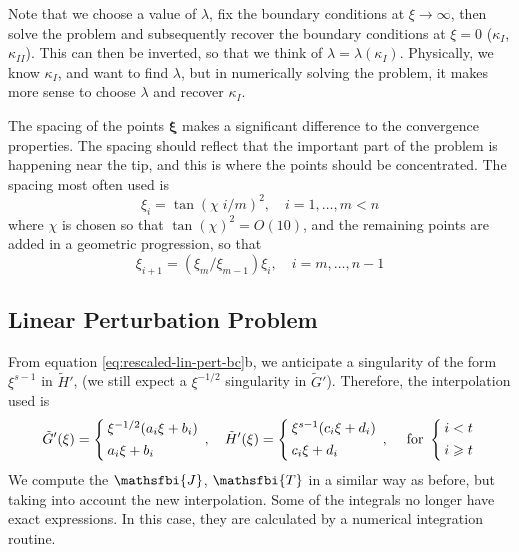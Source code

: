 \documentclass{jfm}
\begin{document}
Note that we choose a value of $\lambda$, fix the boundary conditions
at $\xi \to \infty$, then solve the problem and subsequently recover
the boundary conditions at $\xi=0$ ($\kappa_I$, $\kappa_{II}$).
This can then be inverted, so that we think of $\lambda = \lambda(\kappa_I)$.
Physically, we know $\kappa_I$, and want to find $\lambda$, but in numerically
solving the problem, it makes more sense to choose $\lambda$ and recover 
$\kappa_I$.

The spacing of the points $\boldsymbol{\xi}$ makes a significant difference to 
the convergence properties. The spacing should reflect that the important 
part of the problem is happening near the tip, and this is where the points
should be concentrated. The spacing most often used is 
\begin{equation}
\xi_i = \tan( \chi \; i/m )^2, \quad i=1,\dots,m < n
\end{equation}
where $\chi$ is chosen so that $\tan(\chi)^2 = O(10)$, and the remaining points
are added in a geometric progression, so that 
\begin{equation}
\xi_{i+1} = (\xi_m/\xi_{m-1})\xi_{i} , \quad i = m,\dots,n-1
\end{equation}
%
%
\subsection{Linear Perturbation Problem}
%
%
From equation \ref{eq:rescaled-lin-pert-bc}b, we anticipate a 
singularity of the form $\xi^{s-1}$ in $\tilde{H}'$, (we still expect a
$\xi^{-1/2}$ singularity in $\tilde{G}'$). Therefore, the
interpolation used is
\begin{equation}
\setlength{\arraycolsep}{2pt}
\tilde{G}'(\xi) = \left\{ \begin{array}{l}  
\xi^{-1/2}(a_i \xi + b_i) \\[4pt]
a_i \xi + b_i
 \end{array}\right., \quad
\tilde{H}'(\xi) = \left\{ \begin{array}{l}  
\xi^{s-1}(c_i \xi + d_i) \\[4pt]
c_i \xi + d_i
 \end{array}\right. , \quad
\; \mbox{for\ } \left\{ \begin{array}{l}  
i<t\\[4pt]
i\geq t
\end{array}\right.
\end{equation}
We compute the $\mathsfbi{J}$, $\mathsfbi{T}$ in a similar way as 
before, but taking into account 
the new interpolation. Some of the integrals no longer
have exact expressions. In this case, they are
calculated by a numerical integration routine. 
\end{document}
